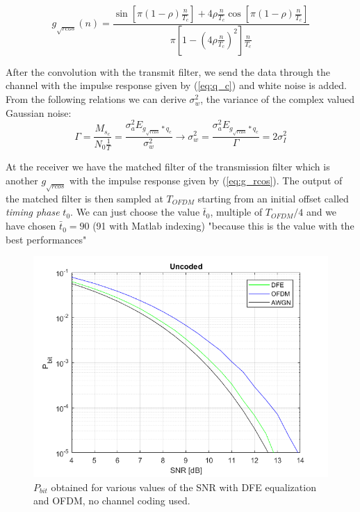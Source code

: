 \documentclass[a4paper,11.5pt]{article}
\begin{document}
\begin{equation}\label{eq:g_rcos}
g_{\sqrt{rcos}}(n) = \frac{\sin\left[\pi\left(1 - \rho\right)\frac{n}{T_c}\right] + 4\rho\frac{n}{T_c}\cos\left[\pi\left(1 - \rho\right)\frac{n}{T_c}\right]}{\pi\left[1-\left(4\rho\frac{n}{T_c}\right)^2\right]\frac{n}{T_c}}
\end{equation}

After the convolution with the transmit filter, we send the data through the channel with the impulse response given by (\ref{eq:q_c}) and white noise is added. From the following relations we can derive $\sigma_w^2$, the variance of the complex valued Gaussian noise:
\begin{equation}
\Gamma = \frac{M_{s_c}}{N_0\frac{1}{T}} = \frac{\sigma_a^2 E_{g_{\sqrt{rcos}} * q_c}}{\sigma_w^2} \longrightarrow \sigma_w^2 = \frac{\sigma_a^2 E_{g_{\sqrt{rcos}} *q_c}}{\Gamma} = 2\sigma_I^2
\end{equation}

At the receiver we have the matched filter of the transmission filter which is another $g_{\sqrt{rcos}}$ with the impulse response given by (\ref{eq:g_rcos}).
The output of the matched filter is then sampled at $T_{OFDM}$ starting from an initial offset called \emph{timing phase} $t_0$. We can just choose the value $\bar{t}_0$, multiple of $T_{OFDM}/4$ and we have chosen $\bar{t}_0=90$ (91 with Matlab indexing) "because this is the value with the best performances"



\begin{figure}[H]
	\begin{center}   
		\includegraphics[width=\textwidth]{figs/Pbit_uncoded.png} 
		\caption{$P_{bit}$ obtained for various values of the SNR with DFE equalization and OFDM, no channel coding used.}
		\label{fig:Pbit_uncoded}
	\end{center}
\end{figure}
\end{document}
